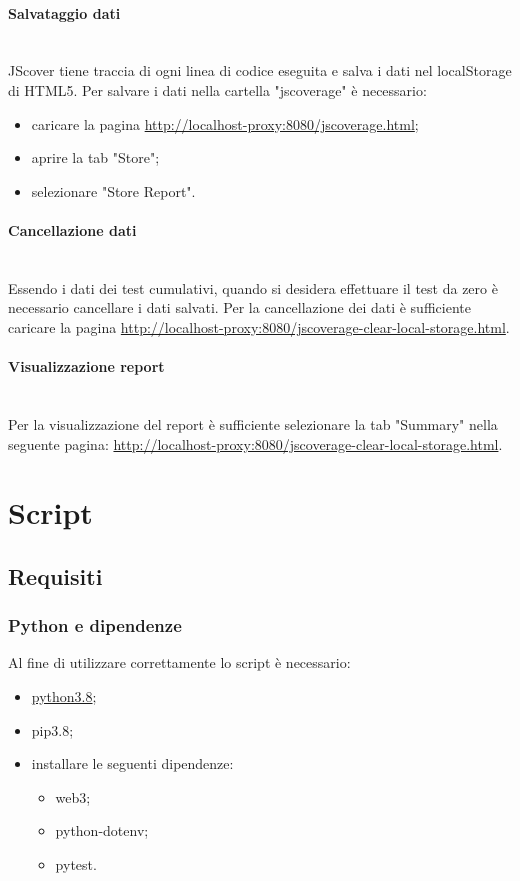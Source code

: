 \documentclass[a4paper, 12pt]{article}
\begin{document}
\paragraph{Salvataggio dati}\\
JScover tiene traccia di ogni linea di codice eseguita e salva i dati nel localStorage di HTML5. Per salvare i dati nella cartella "jscoverage" è necessario:
\begin{itemize}
  \item caricare la pagina \url{http://localhost-proxy:8080/jscoverage.html};
  \item aprire la tab "Store";
  \item selezionare "Store Report".
\end{itemize}
\paragraph{Cancellazione dati}\\
Essendo i dati dei test cumulativi, quando si desidera effettuare il test da zero è necessario cancellare i dati salvati. Per la cancellazione dei dati è sufficiente caricare la pagina \url{http://localhost-proxy:8080/jscoverage-clear-local-storage.html}.
\paragraph{Visualizzazione report}\\
Per la visualizzazione del report è sufficiente selezionare la tab "Summary" nella seguente pagina:  \url{http://localhost-proxy:8080/jscoverage-clear-local-storage.html}.
\section{Script}
\subsection{Requisiti}
\subsubsection{Python e dipendenze}
Al fine di utilizzare correttamente lo script è necessario:
\begin{itemize}
  \item \href{https://www.python.org/downloads/}{python3.8};
  \item pip3.8;
  \item installare le seguenti dipendenze:
  \begin{itemize}
    \item web3;
    \item python-dotenv;
    \item pytest.
  \end{itemize}
\end{itemize}
\end{document}
